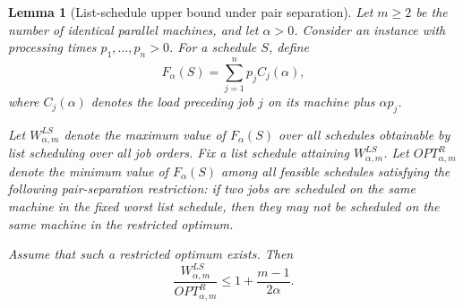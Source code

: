 \documentclass[11pt]{article}
\newtheorem{lemma}{Lemma}
\begin{document}
\begin{lemma}[List-schedule upper bound under pair separation]
Let \(m\ge 2\) be the number of identical parallel machines, and let
\(\alpha>0\). Consider an instance with processing times
\(p_1,\dots,p_n>0\). For a schedule \(S\), define
\[
F_\alpha(S)=\sum_{j=1}^n p_j C_j(\alpha),
\]
where \(C_j(\alpha)\) denotes the load preceding job \(j\) on its machine plus
\(\alpha p_j\).

Let \(W^{LS}_{\alpha,m}\) denote the maximum value of \(F_\alpha(S)\) over all
schedules obtainable by list scheduling over all job orders. Fix a list
schedule attaining \(W^{LS}_{\alpha,m}\). Let \(OPT^R_{\alpha,m}\) denote the
minimum value of \(F_\alpha(S)\) among all feasible schedules satisfying the
following pair-separation restriction: if two jobs are scheduled on the same
machine in the fixed worst list schedule, then they may not be scheduled on
the same machine in the restricted optimum.

Assume that such a restricted optimum exists. Then
\[
\frac{W^{LS}_{\alpha,m}}{OPT^R_{\alpha,m}}
\le
1+\frac{m-1}{2\alpha}.
\]
\end{lemma}
\end{document}
